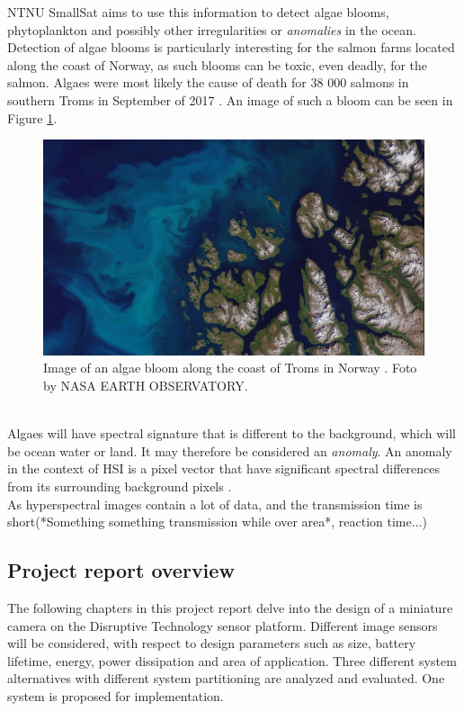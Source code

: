 NTNU SmallSat aims to use this information to detect algae blooms, phytoplankton and possibly other irregularities or \textit{anomalies} in the ocean. Detection of algae blooms is particularly interesting for the salmon farms located along the coast of Norway, as such blooms can be toxic, even deadly, for the salmon. Algaes were most likely the cause of death for 38 000 salmons in southern Troms in September of 2017 \cite{laksedeath}. An image of such a bloom can be seen in Figure \ref{fig:algae_bloom_troms}.  %
\\

\begin{figure}[H]
\centering
   \includegraphics[scale=0.3]{images/algaes/algaes_northern_troms.jpg}
  \caption{ Image of an algae bloom along the coast of Troms in Norway \cite{laksedeath}. Foto by NASA EARTH OBSERVATORY. } 
  \label{fig:algae_bloom_troms}
\end{figure}
\\

Algaes will have spectral signature that is different to the background, which will be ocean water or land. It may therefore be considered an \textit{anomaly}. An anomaly in the context of HSI is a pixel vector that have significant spectral differences from its surrounding background pixels \cite{yang2015dual}.  
\\
As hyperspectral images contain a lot of data, and the transmission time is short(*Something something transmission while over area*, reaction time...)
 
 





\newpage
\subsection{Project report overview}
The following chapters in this project report delve into the design of a miniature camera on the Disruptive Technology sensor platform. Different image sensors will be considered, with respect to design parameters such as size, battery lifetime, energy, power dissipation and area of application. Three different system alternatives with different system partitioning are analyzed and evaluated. One system is proposed for implementation.\\  

